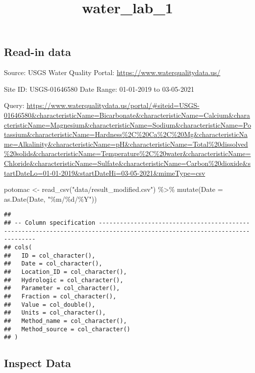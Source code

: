 \documentclass[
]{article}
\title{water\_lab\_1}
\author{}
\date{\vspace{-2.5em}}
\newenvironment{Shaded}{\begin{snugshade}}{\end{snugshade}}
\newcommand{\AttributeTok}[1]{\textcolor[rgb]{0.77,0.63,0.00}{#1}}
\newcommand{\FunctionTok}[1]{\textcolor[rgb]{0.00,0.00,0.00}{#1}}
\newcommand{\NormalTok}[1]{#1}
\newcommand{\OtherTok}[1]{\textcolor[rgb]{0.56,0.35,0.01}{#1}}
\newcommand{\SpecialCharTok}[1]{\textcolor[rgb]{0.00,0.00,0.00}{#1}}
\newcommand{\StringTok}[1]{\textcolor[rgb]{0.31,0.60,0.02}{#1}}
\begin{document}
\maketitle

\hypertarget{read-in-data}{%
\subsection{Read-in data}\label{read-in-data}}

Source: USGS Water Quality Portal:
\url{https://www.waterqualitydata.us/}

Site ID: USGS-01646580 Date Range: 01-01-2019 to 03-05-2021

Query:
\url{https://www.waterqualitydata.us/portal/\#siteid=USGS-01646580\&characteristicName=Bicarbonate\&characteristicName=Calcium\&characteristicName=Magnesium\&characteristicName=Sodium\&characteristicName=Potassium\&characteristicName=Hardness\%2C\%20Ca\%2C\%20Mg\&characteristicName=Alkalinity\&characteristicName=pH\&characteristicName=Total\%20dissolved\%20solids\&characteristicName=Temperature\%2C\%20water\&characteristicName=Chloride\&characteristicName=Sulfate\&characteristicName=Carbon\%20dioxide\&startDateLo=01-01-2019\&startDateHi=03-05-2021\&mimeType=csv}

\begin{Shaded}
\begin{Highlighting}[]
\NormalTok{potomac }\OtherTok{\textless{}{-}} \FunctionTok{read\_csv}\NormalTok{(}\StringTok{"data/result\_modified.csv"}\NormalTok{) }\SpecialCharTok{\%\textgreater{}\%} 
  \FunctionTok{mutate}\NormalTok{(}\AttributeTok{Date =} \FunctionTok{as.Date}\NormalTok{(Date, }\StringTok{"\%m/\%d/\%Y"}\NormalTok{))}
\end{Highlighting}
\end{Shaded}

\begin{verbatim}
## 
## -- Column specification --------------------------------------------------------------------------------------------------------------------------
## cols(
##   ID = col_character(),
##   Date = col_character(),
##   Location_ID = col_character(),
##   Hydrologic = col_character(),
##   Parameter = col_character(),
##   Fraction = col_character(),
##   Value = col_double(),
##   Units = col_character(),
##   Method_name = col_character(),
##   Method_source = col_character()
## )
\end{verbatim}

\hypertarget{inspect-data}{%
\subsection{Inspect Data}\label{inspect-data}}
\end{document}
